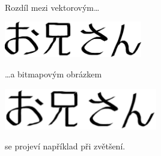 \documentclass[11pt, a4paper]{article}
\begin{document}
\begin{center}
{}
\\
 \label{pic_1}
\end{center}

\newpage

Rozdíl mezi vektorovým\dots
\begin{center}
\includegraphics[width=0.45\textwidth]{oniisan.eps}
 \label{pic_2}
\end{center}
\vspace{1em}
\dots a bitmapovým obrázkem
\begin{center}
\includegraphics[width=0.5\textwidth]{oniisan2.eps}    
 \label{pic_3}
\end{center}
\vspace{1em}
se projeví například při zvětšení.
\end{document}
